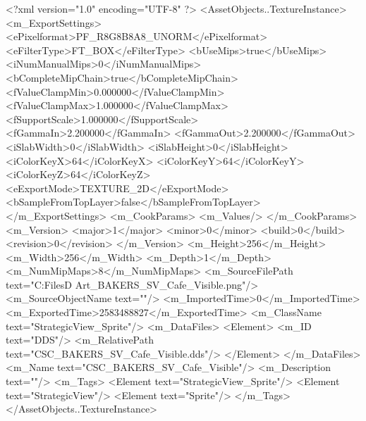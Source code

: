 <?xml version="1.0" encoding="UTF-8" ?>
<AssetObjects..TextureInstance>
	<m_ExportSettings>
		<ePixelformat>PF_R8G8B8A8_UNORM</ePixelformat>
		<eFilterType>FT_BOX</eFilterType>
		<bUseMips>true</bUseMips>
		<iNumManualMips>0</iNumManualMips>
		<bCompleteMipChain>true</bCompleteMipChain>
		<fValueClampMin>0.000000</fValueClampMin>
		<fValueClampMax>1.000000</fValueClampMax>
		<fSupportScale>1.000000</fSupportScale>
		<fGammaIn>2.200000</fGammaIn>
		<fGammaOut>2.200000</fGammaOut>
		<iSlabWidth>0</iSlabWidth>
		<iSlabHeight>0</iSlabHeight>
		<iColorKeyX>64</iColorKeyX>
		<iColorKeyY>64</iColorKeyY>
		<iColorKeyZ>64</iColorKeyZ>
		<eExportMode>TEXTURE_2D</eExportMode>
		<bSampleFromTopLayer>false</bSampleFromTopLayer>
	</m_ExportSettings>
	<m_CookParams>
		<m_Values/>
	</m_CookParams>
	<m_Version>
		<major>1</major>
		<minor>0</minor>
		<build>0</build>
		<revision>0</revision>
	</m_Version>
	<m_Height>256</m_Height>
	<m_Width>256</m_Width>
	<m_Depth>1</m_Depth>
	<m_NumMipMaps>8</m_NumMipMaps>
	<m_SourceFilePath text="C:\Users\Shadow\Desktop\Working Files\2D Art\Quarters\Bakers\StrategicView\CSC_BAKERS_SV_Cafe_Visible.png"/>
	<m_SourceObjectName text=""/>
	<m_ImportedTime>0</m_ImportedTime>
	<m_ExportedTime>2583488827</m_ExportedTime>
	<m_ClassName text="StrategicView_Sprite"/>
	<m_DataFiles>
		<Element>
			<m_ID text="DDS"/>
			<m_RelativePath text="CSC_BAKERS_SV_Cafe_Visible.dds"/>
		</Element>
	</m_DataFiles>
	<m_Name text="CSC_BAKERS_SV_Cafe_Visible"/>
	<m_Description text=""/>
	<m_Tags>
		<Element text="StrategicView_Sprite"/>
		<Element text="StrategicView"/>
		<Element text="Sprite"/>
	</m_Tags>
</AssetObjects..TextureInstance>

